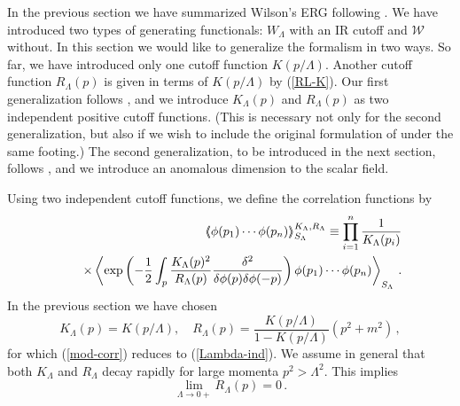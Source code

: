 \documentclass[aps,prd,preprint,groupedaddress,preprintnumbers,longbibliography]{revtex4-1}
\newcommand{\nn}{\nonumber}
\newcommand{\WW}{\mathcal{W}}
\newcommand{\vev}[1]{\left\langle #1 \right\rangle}
\newcommand{\vvev}[1]{\vev{\kern-0.3em\left\langle #1
    \right\rangle\kern-0.3em}}
\begin{document}
In the previous section we have summarized Wilson's ERG following
\cite{Polchinski:1983gv}.  We have introduced two types of generating
functionals: $W_\Lambda$ with an IR cutoff and $\WW$ without.  In this
section we would like to generalize the formalism in two ways.  So
far, we have introduced only one cutoff function $K(p/\Lambda)$.
Another cutoff function $R_\Lambda (p)$ is given in terms of
$K(p/\Lambda)$ by (\ref{RL-K}).  Our first generalization follows
\cite{Sonoda:2015bla}, and we introduce $K_\Lambda (p)$ and $R_\Lambda
(p)$ as two independent positive cutoff functions. (This is necessary
not only for the second generalization, but also if we wish to include
the original formulation of \cite{Wilson:1973jj} under the same
footing.)  The second generalization, to be introduced in the next
section, follows \cite{Igarashi:2016qdr}, and we introduce an
anomalous dimension to the scalar field.

Using two independent cutoff functions, we define the correlation
functions by
\begin{eqnarray}
&&\vvev{\phi (p_1) \cdots \phi (p_n)}_{S_\Lambda}^{K_\Lambda, R_\Lambda}
\equiv \prod_{i=1}^n
\frac{1}{K_\Lambda (p_i)}\nn\\
&&\quad \times 
\vev{\exp \left( - \frac{1}{2} \int_p \frac{K_\Lambda (p)^2}{R_\Lambda (p)}
        \frac{\delta^2}{\delta \phi (p)
      \delta \phi (-p)} \right) \phi (p_1) \cdots \phi
  (p_n)}_{S_\Lambda}\,.\label{mod-corr}
\end{eqnarray}
In the previous section we have chosen
\begin{equation}
K_\Lambda (p) = K(p/\Lambda),\quad
R_\Lambda (p) = \frac{K(p/\Lambda)}{1-K(p/\Lambda)} (p^2+m^2)\,,
\label{polchinski-KR}
\end{equation}
for which (\ref{mod-corr}) reduces to (\ref{Lambda-ind}).  We assume
in general that both $K_\Lambda$ and $R_\Lambda$ decay rapidly for
large momenta $p^2 > \Lambda^2$.  This implies
\begin{equation}
\lim_{\Lambda \to 0+} R_\Lambda (p) = 0\,.\label{vanishing-RL-general}
\end{equation}
\end{document}
